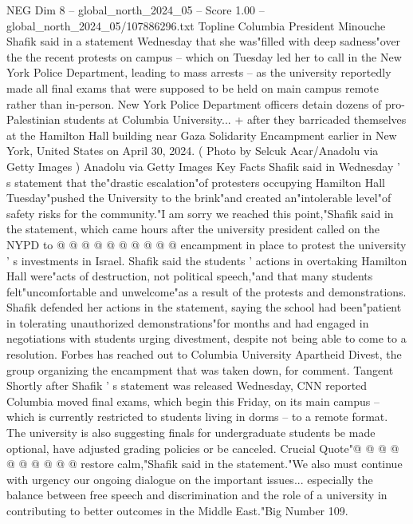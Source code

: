 \begin{textsample}{NEG Dim 8 – global\_north\_2024\_05 – Score 1.00 – global\_north\_2024\_05/107886296.txt}  \label{ex:f8_neg_384}
Topline Columbia President Minouche Shafik said in a statement Wednesday that she was"filled with deep sadness"over the the recent protests on campus -- which on Tuesday led her to call in the New York Police Department, leading to mass arrests -- as the university reportedly made all final exams that were supposed to be held on main campus remote rather than in-person.
New York Police Department officers detain dozens of pro-Palestinian students at Columbia University... + after they barricaded themselves at the Hamilton Hall building near Gaza Solidarity Encampment earlier in New York, United States on April 30, 2024. ( Photo by Selcuk Acar/Anadolu via Getty Images ) Anadolu via Getty Images Key Facts Shafik said in Wednesday ' s statement that the"drastic escalation"of protesters occupying Hamilton Hall Tuesday"pushed the University to the brink"and created an"intolerable level"of safety risks for the community."I am sorry we reached this point,"Shafik said in the statement, which came hours after the university president called on the NYPD to @ @ @ @ @ @ @ @ @ @ encampment in place to protest the university ' s investments in Israel.
Shafik said the students ' actions in overtaking Hamilton Hall were"acts of destruction, not political speech,"and that many students felt"uncomfortable and unwelcome"as a result of the protests and demonstrations.
Shafik defended her actions in the statement, saying the school had been"patient in tolerating unauthorized demonstrations"for months and had engaged in negotiations with students urging divestment, despite not being able to come to a resolution.
Forbes has reached out to Columbia University Apartheid Divest, the group organizing the encampment that was taken down, for comment.
Tangent Shortly after Shafik ' s statement was released Wednesday, CNN reported Columbia moved final exams, which begin this Friday, on its main campus -- which is currently restricted to students living in dorms -- to a remote format.
The university is also suggesting finals for undergraduate students be made optional, have adjusted grading policies or be canceled.
Crucial Quote"@ @ @ @ @ @ @ @ @ @ restore calm,"Shafik said in the statement."We also must continue with urgency our ongoing dialogue on the important issues... especially the balance between free speech and discrimination and the role of a university in contributing to better outcomes in the Middle East."Big Number 109.

\end{textsample}
